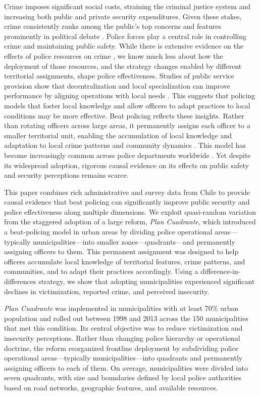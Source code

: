 Crime imposes significant social costs, straining the criminal justice system and increasing both public and private security expenditures. Given these stakes, crime consistently ranks among the public's top concerns and features prominently in political debate \citep{Scartascini, gallup2023}. Police forces play a central role in controlling crime and maintaining public safety. While there is extensive evidence on the effects of police resources on crime \citep[see, for instance,][]{Chalfin_JEL,Levitt_1997,DiTella}, we know much less about how the deployment of those resources, and the strategy changes enabled by different territorial assignments, shape police effectiveness. Studies of public service provision show that decentralization and local specialization can improve performance by aligning operations with local needs \citep[see, for instance,][]{besley2003centralized}. This suggests that policing models that foster local knowledge and allow officers to adapt practices to local conditions may be more effective. Beat policing reflects these insights. Rather than rotating officers across large areas, it permanently assigns each officer to a smaller territorial unit, enabling the accumulation of local knowledge and adaptation to local crime patterns and community dynamics \citep{cordner1995community,skogan1997comminuty}. This model has become increasingly common across police departments worldwide \citep{NASEM2018,PCSP2014}. Yet despite its widespread adoption, rigorous causal evidence on its effects on public safety and security perceptions remains scarce.

This paper combines rich administrative and survey data from Chile to provide causal evidence that beat policing can significantly improve public security and police effectiveness along multiple dimensions. We exploit quasi-random variation from the staggered adoption of a large reform, \emph{Plan Cuadrante}, which introduced a beat-policing model in urban areas by dividing police operational areas---typically municipalities---into smaller zones---quadrants---and permanently assigning officers to them. This permanent assignment was designed to help officers accumulate local knowledge of territorial features, crime patterns, and communities, and to adapt their practices accordingly. Using a difference-in-differences strategy, we show that adopting municipalities experienced significant declines in victimization, reported crime, and perceived insecurity.

\emph{Plan Cuadrante} was implemented in municipalities with at least 70\% urban population and rolled out between 1998 and 2013 across the 150 municipalities that met this condition. Its central objective was to reduce victimization and insecurity perceptions. Rather than changing police hierarchy or operational doctrine, the reform reorganized frontline deployment by subdividing police operational areas---typically municipalities---into quadrants and permanently assigning officers to each of them.
On average, municipalities were divided into seven quadrants, with size and boundaries defined by local police authorities based on road networks, geographic features, and available resources.


